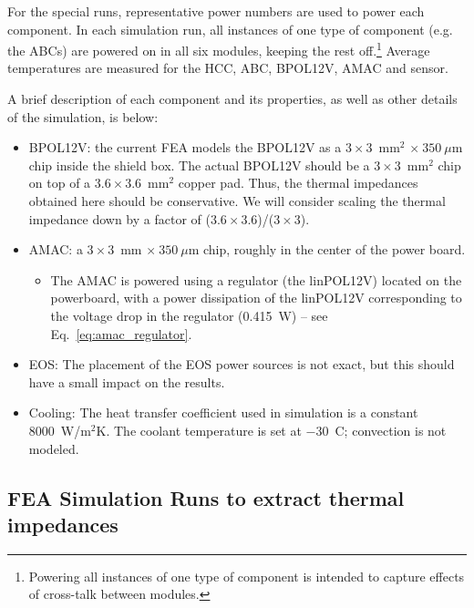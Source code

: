 For the special runs,
representative power numbers are used to power each component. In each simulation run, all instances
of one type of component (e.g. the ABCs) are powered on in all six modules, keeping the rest
off.\footnote{Powering all instances of one type of component is intended to capture effects of
cross-talk between modules.}
Average temperatures are measured for the HCC, ABC, BPOL12V, AMAC and sensor.

\def\thcc{\ensuremath{\overline{T}_\text{nHCC}}}
\def\tabc{\ensuremath{\overline{T}_\text{nABC}}}
\def\tfeast{\ensuremath{\overline{T}_\text{BPOL12V}}}
\def\tsensor{\ensuremath{T_\text{sensor}}}
\def\Rm{\ensuremath{{\text{R}m}}}

A brief description of each component and its properties, as well as other details
of the simulation, is below:
\begin{itemize}
\item BPOL12V: the current FEA models the BPOL12V as a $3\times3$~mm$^2$ $\times~350~\mu$m chip inside
the shield box. The actual BPOL12V should be a $3\times3$~mm$^2$ chip on top of a $3.6\times3.6$~mm$^2$
copper pad. Thus, the thermal impedances obtained here should be conservative. We will 
consider scaling the thermal impedance down by a factor of ($3.6\times3.6$)/($3\times3$).
\item AMAC: a $3\times3$~mm $\times~350~\mu$m chip, roughly in the center of the power board.
  \begin{itemize}
    \item The AMAC is powered using a regulator (the linPOL12V) located on the powerboard, with a power dissipation
      of the linPOL12V corresponding to the voltage drop in the regulator (0.415~W) -- see Eq.~\ref{eq:amac_regulator}.
  \end{itemize}
\item EOS: The placement of the EOS power sources is not exact, but this should have a small impact
  on the results.
\item Cooling: The heat transfer coefficient used in simulation is a constant 8000~W/m$^{2}$K.
  The coolant temperature is set at $-30$~C; convection is not modeled.
\end{itemize}




\subsection{FEA Simulation Runs to extract thermal impedances}

